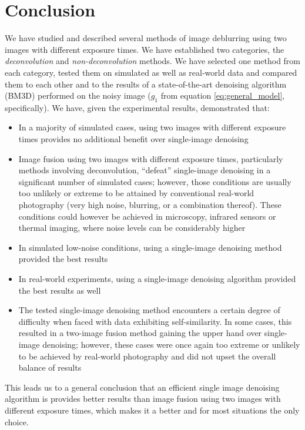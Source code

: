 \documentclass[12pt,notitlepage]{report}
\begin{document}
\chapter{Conclusion}

We have studied and described several methods of image deblurring using two images with different exposure times. We have established two categories, the {\em deconvolution} and {\em non-deconvolution} methods.  We have selected one method from each category, tested them on simulated as well as real-world data and compared them to each other and to the results of a state-of-the-art denoising algorithm (BM3D) performed on the noisy image ($g_1$ from equation \ref{eq:general_model}, specifically). We have, given the experimental results, demonstrated that: 

\begin{itemize}
\item In a majority of simulated cases, using two images with different exposure times provides no additional benefit over single-image denoising
\item Image fusion using two images with different exposure times, particularly methods involving deconvolution, “defeat” single-image denoising in a significant number of simulated cases; however, those conditions are usually too unlikely or extreme to be attained by conventional real-world photography (very high noise, blurring, or a combination thereof). These conditions could however be achieved in microscopy, infrared sensors or thermal imaging, where noise levels can be considerably higher
\item In simulated low-noise conditions, using a single-image denoising method provided the best results
\item In real-world experiments, using a single-image denoising algorithm provided the best results as well
\item The tested single-image denoising method encounters a certain degree of difficulty when faced with data exhibiting self-similarity. In some cases, this resulted in a two-image fusion method gaining the upper hand over single-image denoising; however, these cases were once again too extreme or unlikely to be achieved by real-world photography and did not upset the overall balance of results
\end{itemize}

This leads us to a general conclusion that an efficient single image denoising algorithm is provides better results than image fusion using two images with different exposure times, which makes it a better and for most situations the only choice. 
\end{document}
